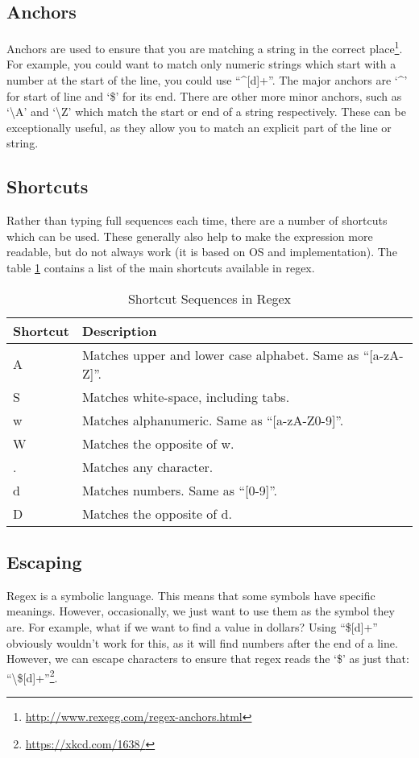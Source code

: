 		\subsection{Anchors}
			Anchors are used to ensure that you are matching a string in the correct place\footnote{\url{http://www.rexegg.com/regex-anchors.html}}.
			For example, you could want to match only numeric strings which start with a number at the start of the line,
			you could use ``\^{}[d]+''.
			The major anchors are `\^{}' for start of line and `\$' for its end.
			There are other more minor anchors, such as `\textbackslash{}A' and `\textbackslash{}Z' which match the start or end of a string respectively.
			These can be exceptionally useful, as they allow you to match an explicit part of the line or string.
		\subsection{Shortcuts}
			Rather than typing full sequences each time, there are a number of shortcuts which can be used.
			These generally also help to make the expression more readable, but do not always work (it is based on OS and implementation).
			The table \ref{tab:regexShortcuts} contains a list of the main shortcuts available in regex.
			\begin{table}[htb]
				\centering
				\begin{tabular}{ll}
					\toprule
					\textbf{Shortcut} & \textbf{Description} \\
					\toprule
					A & Matches upper and lower case alphabet. Same as ``[a-zA-Z]''. \\
					S & Matches white-space, including tabs. \\
					w & Matches alphanumeric. Same as ``[a-zA-Z0-9]''. \\
					W & Matches the opposite of w. \\
					. & Matches any character. \\
					d & Matches numbers. Same as ``[0-9]''. \\
					D & Matches the opposite of d. \\
					\bottomrule
				\end{tabular}
				\caption{Shortcut Sequences in Regex}
				\label{tab:regexShortcuts}
			\end{table}
		\subsection{Escaping}
			Regex is a symbolic language.
			This means that some symbols have specific meanings.
			However, occasionally, we just want to use them as the symbol they are.
			For example, what if we want to find a value in dollars?
			Using ``\$[d]+'' obviously wouldn't work for this, as it will find numbers after the end of a line.
			However, we can escape characters to ensure that regex reads the `\$' as just that:
			``\textbackslash\$[d]+''\footnote{\url{https://xkcd.com/1638/}}.

